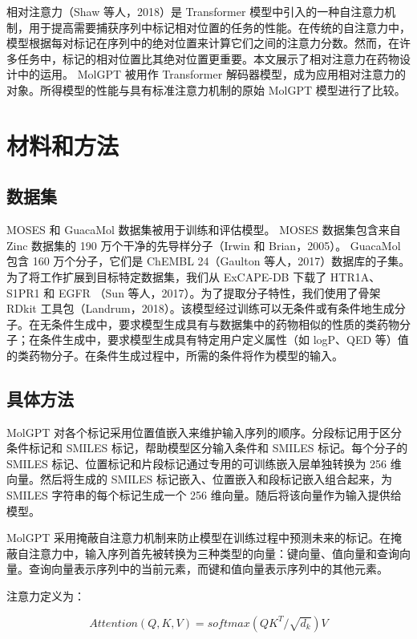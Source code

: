 \begin{translation}
相对注意力（Shaw 等人，2018）是 Transformer 模型中引入的一种自注意力机制，用于提高需要捕获序列中标记相对位置的任务的性能。在传统的自注意力中，模型根据每对标记在序列中的绝对位置来计算它们之间的注意力分数。然而，在许多任务中，标记的相对位置比其绝对位置更重要。本文展示了相对注意力在药物设计中的运用。 MolGPT 被用作 Transformer 解码器模型，成为应用相对注意力的对象。所得模型的性能与具有标准注意力机制的原始 MolGPT 模型进行了比较。

\section{材料和方法}

\subsection{数据集}

MOSES 和 GuacaMol 数据集被用于训练和评估模型。 MOSES 数据集包含来自 Zinc 数据集的 190 万个干净的先导样分子（Irwin 和 Brian，2005）。 GuacaMol 包含 160 万个分子，它们是 ChEMBL 24（Gaulton 等人，2017）数据库的子集。为了将工作扩展到目标特定数据集，我们从 ExCAPE-DB 下载了 HTR1A、S1PR1 和 EGFR （Sun 等人，2017）。为了提取分子特性，我们使用了骨架 RDkit 工具包（Landrum，2018）。该模型经过训练可以无条件或有条件地生成分子。在无条件生成中，要求模型生成具有与数据集中的药物相似的性质的类药物分子；在条件生成中，要求模型生成具有特定用户定义属性（如 logP、QED 等）值的类药物分子。在条件生成过程中，所需的条件将作为模型的输入。

\subsection{具体方法}

MolGPT 对各个标记采用位置值嵌入来维护输入序列的顺序。分段标记用于区分条件标记和 SMILES 标记，帮助模型区分输入条件和 SMILES 标记。每个分子的 SMILES 标记、位置标记和片段标记通过专用的可训练嵌入层单独转换为 256 维向量。然后将生成的 SMILES 标记嵌入、位置嵌入和段标记嵌入组合起来，为 SMILES 字符串的每个标记生成一个 256 维向量。随后将该向量作为输入提供给模型。

MolGPT 采用掩蔽自注意力机制来防止模型在训练过程中预测未来的标记。在掩蔽自注意力中，输入序列首先被转换为三种类型的向量：键向量、值向量和查询向量。查询向量表示序列中的当前元素，而键和值向量表示序列中的其他元素。

注意力定义为：

\begin{equation}
  Attention(Q,K,V)=softmax({QK^T}/ {\sqrt{d_k}})V
\end{equation}


\end{translation}

